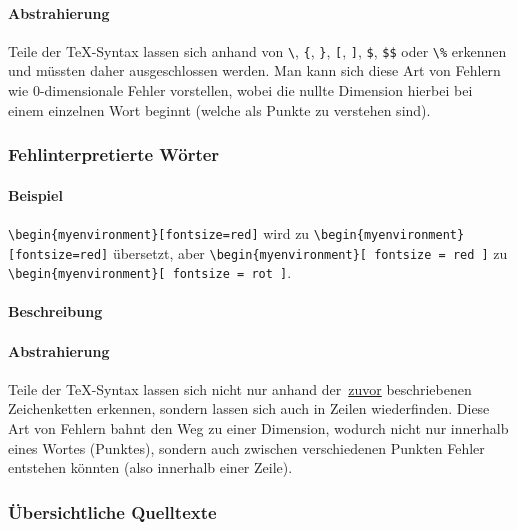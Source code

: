 \paragraph*{Abstrahierung}
Teile der \TeX{}-Syntax lassen sich anhand von \verb|\|, \verb|{|, \verb|}|, \verb|[|, \verb|]|, \verb|$|, \verb|$$| oder \verb|\%| erkennen und müssten daher ausgeschlossen werden. Man kann sich diese Art von Fehlern wie 0-dimensionale Fehler vorstellen, wobei die nullte Dimension hierbei bei einem einzelnen Wort beginnt (welche als Punkte zu verstehen sind).

\subsubsection{Fehlinterpretierte Wörter}\label{problems:dim1}%
\paragraph*{Beispiel}
\verb|\begin{myenvironment}[fontsize=red]| wird zu \verb|\begin{myenvironment}[fontsize=red]| übersetzt, aber \verb|\begin{myenvironment}[ fontsize = red ]| zu \verb|\begin{myenvironment}[ fontsize = rot ]|.
\paragraph*{Beschreibung}
\paragraph*{Abstrahierung}
Teile der \TeX-Syntax lassen sich nicht nur anhand der~\hyperref[problems:unexpectedCharacters]{zuvor} beschriebenen Zeichenketten erkennen, sondern lassen sich auch in Zeilen wiederfinden. Diese Art von Fehlern bahnt den Weg zu einer Dimension, wodurch nicht nur innerhalb eines Wortes (Punktes), sondern auch zwischen verschiedenen Punkten Fehler entstehen könnten (also innerhalb einer Zeile).


\subsubsection{Übersichtliche Quelltexte}\label{problems:dim2}
